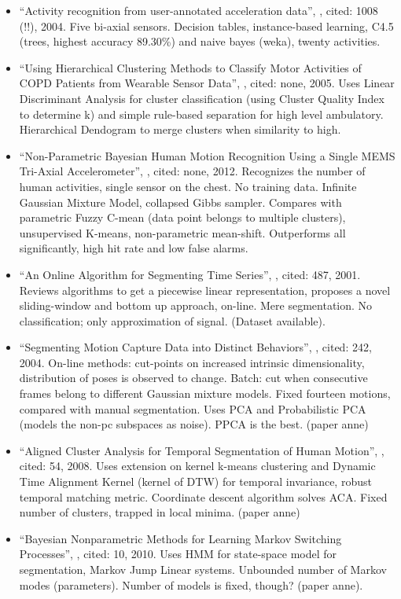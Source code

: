 \begin{itemize}
  \item ``Activity recognition from user-annotated acceleration data'', \cite{bao2004activity}, cited: 1008 (!!), 2004. Five bi-axial sensors. Decision tables, instance-based learning, C4.5 (trees, highest accuracy 89.30\%) and naive bayes (weka), twenty activities.
  \item ``Using Hierarchical Clustering Methods to Classify Motor Activities of COPD Patients from Wearable Sensor Data'', \cite{sherril2005using}, cited: none, 2005. Uses Linear Discriminant Analysis for cluster classification (using Cluster Quality Index to determine k) and simple rule-based separation for high level ambulatory. Hierarchical Dendogram to merge clusters when similarity to high.
  \item ``Non-Parametric Bayesian Human Motion Recognition Using a Single MEMS Tri-Axial Accelerometer'', \cite{ahmed2012non}, cited: none, 2012. Recognizes the number of human activities, single sensor on the chest. No training data. Infinite Gaussian Mixture Model, collapsed Gibbs sampler. Compares with parametric Fuzzy C-mean (data point belongs to multiple clusters), unsupervised K-means, non-parametric mean-shift. Outperforms all significantly, high hit rate and low false alarms.
  \item ``An Online Algorithm for Segmenting Time Series'', \cite{keogh2001online}, cited: 487, 2001. Reviews algorithms to get a piecewise linear representation, proposes a novel sliding-window and bottom up approach, on-line. Mere segmentation. No classification; only approximation of signal. (Dataset available).
  \item ``Segmenting Motion Capture Data into Distinct Behaviors'', \cite{barbivc2004segmenting}, cited: 242, 2004. On-line methods: cut-points on increased intrinsic dimensionality, distribution of poses is observed to change. Batch: cut when consecutive frames belong to different Gaussian mixture models. Fixed fourteen motions, compared with manual segmentation. Uses PCA and Probabilistic PCA (models the non-pc subspaces as noise). PPCA is the best. (paper anne)
  \item ``Aligned Cluster Analysis for Temporal Segmentation of Human Motion'', \cite{zhou2008aligned}, cited: 54, 2008. Uses extension on kernel k-means clustering and Dynamic Time Alignment Kernel (kernel of DTW) for temporal invariance, robust temporal matching metric. Coordinate descent algorithm solves ACA. Fixed number of clusters, trapped in local minima. (paper anne)
  \item ``Bayesian Nonparametric Methods for Learning Markov Switching Processes'', \cite{fox2010bayesian}, cited: 10, 2010. Uses HMM for state-space model for segmentation, Markov Jump Linear systems. Unbounded number of Markov modes (parameters). Number of models is fixed, though? (paper anne).

\end{itemize}
